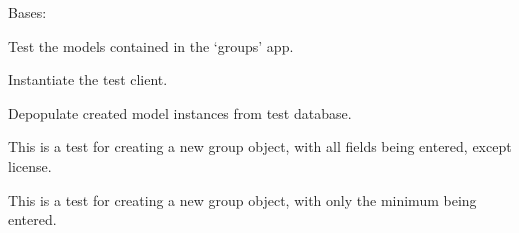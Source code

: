 \documentclass[letterpaper,10pt,english]{sphinxmanual}
\begin{document}
\begin{fulllineitems}
\label{api:mousedb.groups.tests.GroupsModelTests}
Bases: 

Test the models contained in the `groups' app.

\begin{fulllineitems}
\label{api:mousedb.groups.tests.GroupsModelTests.setUp}
Instantiate the test client.

\end{fulllineitems}


\begin{fulllineitems}
\label{api:mousedb.groups.tests.GroupsModelTests.tearDown}
Depopulate created model instances from test database.

\end{fulllineitems}


\begin{fulllineitems}
\label{api:mousedb.groups.tests.GroupsModelTests.test_create_group_all_fields}
This is a test for creating a new group object, with all fields being entered, except license.

\end{fulllineitems}


\begin{fulllineitems}
\label{api:mousedb.groups.tests.GroupsModelTests.test_create_group_minimal}
This is a test for creating a new group object, with only the minimum being entered.

\end{fulllineitems}



\end{fulllineitems}
\end{document}

